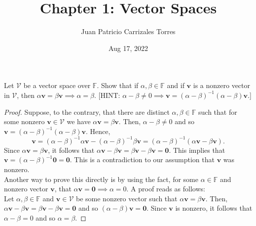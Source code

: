 \documentclass[12pt]{article}
\newenvironment{problem}[2][Problem]{\begin{trivlist} \item[\hskip \labelsep {\bfseries #1}\hskip \labelsep {\bfseries #2.}]}{\end{trivlist}}
\begin{document}
  
 \title{Chapter 1: Vector Spaces}
   \author{Juan Patricio Carrizales Torres}
     \date{Aug 17, 2022}
       \maketitle


       \begin{problem}{1.1}
	Let $\mathcal{V}$ be a vector space over $\mathbb{F}$. Show that if $\alpha,\beta \in \mathbb{F}$ and if $\mathbf{v}$ is a nonzero vector in $\mathcal{V}$, then $\alpha \mathbf{v} = \beta \mathbf{v} \implies \alpha = \beta$. [HINT: $\alpha - \beta \neq 0 \implies \mathbf{v} = (\alpha - \beta)^{-1}(\alpha - \beta)\mathbf{v}$.]
    \begin{proof}
      Suppose, to the contrary, that there are distinct $\alpha,\beta\in \mathbb{F}$ such that for some nonzero $\mathbf{v} \in \mathcal{V}$ we have $\alpha \mathbf{v} = \beta \mathbf{v}$. Then, $\alpha - \beta \neq 0$ and so $\mathbf{v} = (\alpha - \beta)^{-1}(\alpha - \beta)\mathbf{v}$. Hence,  
    \begin{equation*}
      \mathbf{v} = (\alpha-\beta)^{-1} \alpha \mathbf{v} - (\alpha-\beta)^{-1} \beta \mathbf{v}  = (\alpha-\beta)^{-1} (\alpha \mathbf{v} - \beta \mathbf{v}).
    \end{equation*}
    Since $\alpha \mathbf{v} = \beta \mathbf{v}$, it follows that $\alpha \mathbf{v} - \beta \mathbf{v} = \beta \mathbf{v} - \beta \mathbf{v} = \mathbf{0}$. This implies that $\mathbf{v} = (\alpha - \beta)^{-1} \mathbf{0} = \mathbf{0}$. This is a contradiction to our assumption that $\mathbf{v}$ was nonzero.\\

    Another way to prove this directly is by using the fact, for some $\alpha \in \mathbb{F}$ and nonzero vector $\mathbf{v}$, that $\alpha\mathbf{v} = \mathbf{0} \implies \alpha = 0$. A proof reads as follows:\\

    Let $\alpha,\beta \in \mathbb{F}$ and $\mathbf{v}\in \mathcal{V}$ be some nonzero vector such that $\alpha \mathbf{v} = \beta \mathbf{v}$. Then, $\alpha \mathbf{v} - \beta \mathbf{v} = \beta \mathbf{v} - \beta \mathbf{v} = \mathbf{0}$ and so $(\alpha - \beta) \mathbf{v} = \mathbf{0}$. Since $\mathbf{v}$ is nonzero, it follows that $\alpha - \beta = 0$ and so $\alpha = \beta$.
    \end{proof}
    \end{problem}
\end{document}

